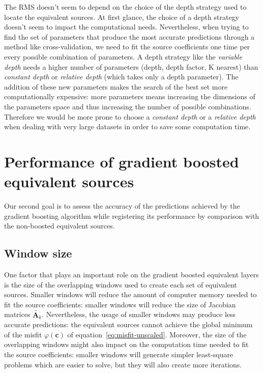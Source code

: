 \documentclass[twocolumn]{article}
\begin{document}
The RMS doesn't seem to depend on the choice of the depth strategy used to
locate the equivalent sources.
At first glance, the choice of a depth strategy doesn't seem to impact the
computational needs.
Nevertheless, when trying to find the set of parameters that produce the most
accurate predictions through a method like cross-validation, we need to fit the
source coefficients one time per every possible combination of parameters.
A depth strategy like the \emph{variable depth} needs a higher number of
parameters (depth, depth factor, K nearest) than \emph{constant depth} or
\emph{relative depth} (which takes only a depth parameter).
The addition of these new parameters makes the search of the best set more
computationally expensive: more parameters means increasing the dimensions of
the parameters space and thus increasing the number of possible combinations.
Therefore we would be more prone to choose a \emph{constant depth} or
a \emph{relative depth} when dealing with very large datasets in order to save
some computation time.


\section{Performance of gradient boosted equivalent sources}

Our second goal is to assess the accuracy of the predictions achieved by the
gradient boosting algorithm while registering its performance by comparison
with the non-boosted equivalent sources.


\subsection{Window size}

One factor that plays an important role on the gradient boosted equivalent
layers is the size of the overlapping windows used to create each set of
equivalent sources.
Smaller windows will reduce the amount of computer memory needed to fit the
source coefficients: smaller windows will reduce the size of Jacobian matrices
$\tilde{\mathbf{A}_k}$.
Nevertheless, the usage of smaller windows may produce less accurate
predictions: the equivalent sources cannot achieve the global minimum of the
misfit $\varphi(\mathbf{c})$ of equation~\ref{eq:misfit-unscaled}.
Moreover, the size of the overlapping windows might also impact on the
computation time needed to fit the source coefficients: smaller windows will
generate simpler least-square problems which are easier to solve, but they will
also create more iterations.
\end{document}

